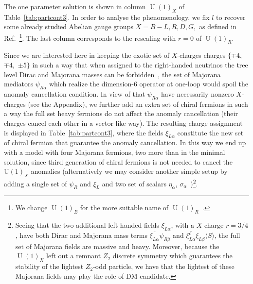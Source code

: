 \documentclass[12pt]{article}
\begin{document}
The one parameter solution is shown in  column $\operatorname{U}(1)_X$
of Table~\ref{tab:partcont3}.
In order to analyse the phenomenology, we fix $l$ to recover some already studied
Abelian gauge groups $X=B-L,R,D,G,$ as defined in Ref.~\cite{Campos:2017dgc}\footnote{We change $\operatorname{U}(1)_B$ for the more suitable name of $\operatorname{U}(1)_R$~\cite{Jana:2019mez}.}. The last column corresponds to the rescaling with $r=0$ of $\operatorname{U}(1)_R$.

Since we are interested here in keeping the exotic set of $X$-charges
charges $\{\mp 4$,~$\mp 4$,~$\pm 5\}$ in such a way that when assigned
to the right-handed neutrinos the tree level Dirac and Majorana masses
can be forbidden~\cite{Calle:2018ovc}, the set of Majorana mediators
$\psi_{R\alpha}$ which realize the dimension-6 operator at one-loop
 would spoil the anomaly cancellation
condition.
In view of that $\psi_{R\alpha}$ have necessarily nonzero $X$-charges (see the Appendix), we further add an extra set of chiral fermions in 
such a way the full set heavy fermions  do not affect
the anomaly cancellation (their charges cancel each other in a vector like way). 
The resulting charge assignment is displayed in
Table~\ref{tab:partcont3}, where 
the fields $\xi_{L \alpha}$ constitute the new set of chiral fermion that guarantee the anomaly cancellation.
In this way we end up with a model with four Majorana fermions, two more than in the minimal solution, since third generation of chiral fermions is not needed to cancel the $\operatorname{U(1)}_X$ anomalies (alternatively we may consider another simple setup by adding a single set of $\psi_R$ and $\xi_L$ and two set of scalars $\eta_\alpha$, $\sigma_{\alpha}$~\cite{Reig:2018mdk})\footnote{
Seeing that the two additional left-handed fields $\xi_{L\alpha}$,  with a $X$-charge $r=3/4$,  have both Dirac and Majorana mass terms $\overline{\xi_{L \alpha}}\psi_{R \beta}$ and $ \overline{\xi_{L\alpha}^c }\xi_{L \beta} \langle S\rangle$, the full set of Majorana fields are massive and heavy. 
Moreover, because the $\operatorname{U}(1)_{X}$ left out a remnant $Z_2$ discrete symmetry which guarantees the stability of the lightest $Z_2$-odd particle,  we have that the lightest of these Majorana fields may play the role of DM candidate.}.



\end{document}
